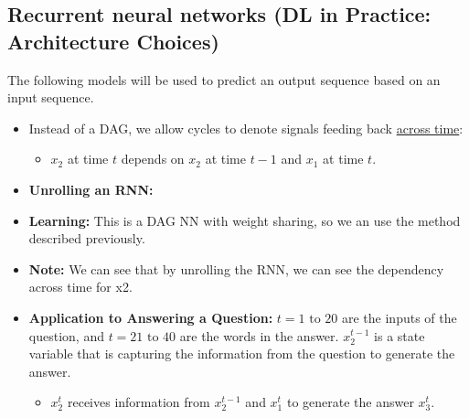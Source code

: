\subsection{Recurrent neural networks (DL in Practice: Architecture Choices)}
\begin{warning}
    The following models will be used to predict an output sequence based on an input sequence.
\end{warning}

\begin{summary}
    \begin{itemize}
        \item Instead of a DAG, we allow cycles to denote signals feeding back \underline{across time}:
        \begin{itemize}
            \item \( x_2 \) at time \( t \) depends on \( x_2 \) at time \( t-1 \) and \( x_1 \) at time \( t \).
        \end{itemize}
    
        \item \textbf{Unrolling an RNN:}
    
        \item \textbf{Learning:} This is a DAG NN with weight sharing, so we an use the method described previously.
        \item \textbf{Note:} We can see that by unrolling the RNN, we can see the dependency across time for x2.
        \item \textbf{Application to Answering a Question:} $t=1 \text{ to } 20$ are the inputs of the question, and $t=21 \text{ to } 40$ are the words in the answer. $x_2^{t-1}$ is a state variable that is capturing the information from the question to generate the answer. 
        \begin{itemize}
            \item $x_2^t$ receives information from $x_2^{t-1}$ and $x_1^t$ to generate the answer $x_3^t$.
        \end{itemize}
    \end{itemize}
\end{summary}

